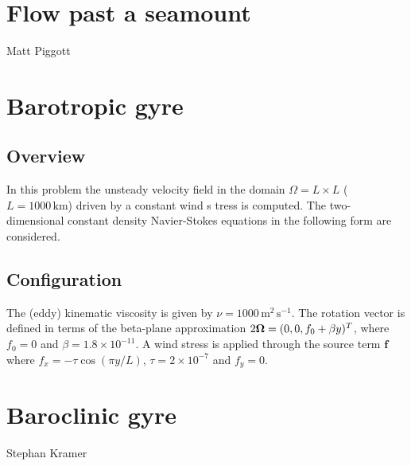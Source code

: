 
\section{Flow past a seamount}
\label{sect:seamount}

Matt Piggott



\section{Barotropic gyre}
\label{sect:barotropic_gyre}
\subsection{Overview}
In this problem the unsteady velocity field in the domain $\Omega = L\times L$
($L=1000\,\textrm{km}$) driven by a constant
wind s
tress is computed.
The two-dimensional constant density Navier-Stokes equations in the following form are considered.

\subsection{Configuration}
The (eddy) kinematic viscosity is given by $\nu = 1000\,\textrm{m}^2\,\textrm{s}^{-1}$.
The rotation vector is defined in terms of the beta-plane approximation
$2{\mbox{\boldmath$\Omega$}}=(0,0,f_0 + \beta y)^T$, where $f_0=0$ and $\beta=1.8\times 10^{-11}$.
A wind stress is applied through the source term $\pmb{f}$ where $f_x = -\tau \cos (\pi y/L)$,
$\tau = 2\times 10^{-7}$ and $f_y=0$.



\section{Baroclinic gyre}
\label{sect:baroclinic_gyre}

Stephan Kramer

